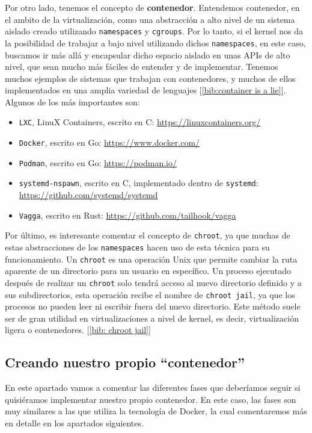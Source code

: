 \documentclass[12pt]{article}
\begin{document}
	\noindent Por otro lado, tenemos el concepto de \textbf{contenedor}. Entendemos contenedor, en el ambito de la virtualización, como una abstracción a alto nivel de un sistema aislado creado utilizando \texttt{namespaces} y \texttt{cgroups}. Por lo tanto, si el kernel nos da la posibilidad de trabajar a bajo nivel utilizando dichos \texttt{namespaces}, en este caso, buscamos ir más allá y encapsular dicho espacio aislado en unas APIs de alto nivel, que sean mucho más fáciles de entender y de implementar. Tenemos muchos ejemplos de sistemas que trabajan con contenedores, y muchos de ellos implementados en una amplia variedad de lenguajes [\ref{bib:container is a lie}]. Algunos de los más importantes son:
	\begin{itemize}
		\item \texttt{LXC}, LinuX Containers, escrito en C: \url{https://linuxcontainers.org/}
		\item \texttt{Docker}, escrito en Go: \url{https://www.docker.com/}
		\item \texttt{Podman}, escrito en Go: \url{https://podman.io/}
		\item \texttt{systemd-nspawn}, escrito en C, implementado dentro de \texttt{systemd}: \url{https://github.com/systemd/systemd}
		\item \texttt{Vagga}, escrito en Rust: \url{https://github.com/tailhook/vagga}
	\end{itemize}

	\noindent Por último, es interesante comentar el concepto de \texttt{chroot}, ya que muchas de estas abstracciones de los \texttt{namespaces} hacen uso de esta técnica para su funcionamiento. Un \texttt{chroot} es una operación Unix que permite cambiar la ruta aparente de un directorio para un usuario en específico. Un proceso ejecutado después de realizar un \texttt{chroot} solo tendrá acceso al nuevo directorio definido y a sus subdirectorios, esta operación recibe el nombre de \texttt{chroot jail}, ya que los procesos no pueden leer ni escribir fuera del nuevo directorio. Este método suele ser de gran utilidad en virtualizaciones a nivel de kernel, es decir, virtualización ligera o contenedores. [\ref{bib: chroot jail}]
	
	\pagebreak
	
	\subsection{Creando nuestro propio ``contenedor''}
	\noindent En este apartado vamos a comentar las diferentes fases que deberíamos seguir si quisiéramos implementar nuestro propio contenedor. En este caso, las fases son muy similares a las que utiliza la tecnología de Docker, la cual comentaremos más en detalle en los apartados siguientes. \\
	
\end{document}
